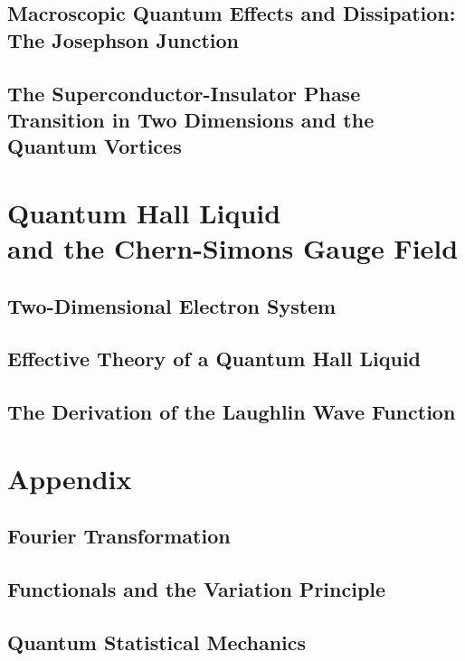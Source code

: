 \documentclass[twoside,11pt]{report}
\begin{document}
\section{Macroscopic Quantum Effects and Dissipation: The Josephson Junction}
\section{The Superconductor-Insulator Phase Transition in Two Dimensions and the Quantum Vortices}
\chapter{Quantum Hall Liquid\\ and the Chern-Simons Gauge Field}
\section{Two-Dimensional Electron System}
\section{Effective Theory of a Quantum Hall Liquid}
\section{The Derivation of the Laughlin Wave Function}
\appendix
\chapter{Appendix}
\section{Fourier Transformation}
\section{Functionals and the Variation Principle}
\section{Quantum Statistical Mechanics}
\end{document}
